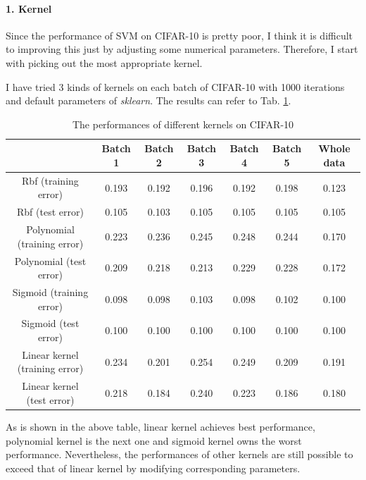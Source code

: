 \documentclass[12pt,a4paper]{article}
\theoremstyle{definition}
\begin{document}
\paragraph{1. Kernel}

\vspace{0.01\linewidth}
Since the performance of SVM on CIFAR-10 is pretty poor, I think it is difficult to improving this just by adjusting some numerical parameters. Therefore, I start with picking out the most appropriate kernel.

\vspace{0.01\linewidth}
I have tried 3 kinds of kernels on each batch of CIFAR-10 with 1000 iterations and default parameters of \textit{sklearn}. The results can refer to Tab. \ref{tab:bonus-kernel}.

\begin{table}[H]
	\renewcommand\arraystretch{1.5}
	\caption{The performances of different kernels on CIFAR-10}
	\label{tab:bonus-kernel}
	\centering
	
	\begin{tabular}{c|c|c|c|c|c|c}
		\centering
		 & Batch 1 & Batch 2 & Batch 3 & Batch 4 & Batch 5 & Whole data \\
		\hline
		\hline
		
		Rbf (training error) & 0.193 & 0.192 & 0.196 & 0.192 & 0.198 &  0.123 \\
		Rbf (test error) & 0.105 & 0.103 & 0.105 & 0.105 & 0.105 & 0.105 \\
		Polynomial (training error) & 0.223 & 0.236 & 0.245 & 0.248 & 0.244 & 0.170 \\
		Polynomial (test error) & 0.209 & 0.218 & 0.213 & 0.229 & 0.228 & 0.172 \\
		Sigmoid (training error) & 0.098 & 0.098 & 0.103 & 0.098 & 0.102 & 0.100 \\
		Sigmoid (test error) & 0.100 & 0.100 & 0.100 & 0.100 & 0.100 & 0.100 \\
		Linear kernel (training error) & 0.234 & 0.201 & 0.254 & 0.249 & 0.209 & 0.191 \\
		Linear kernel (test error) & 0.218 & 0.184 & 0.240 & 0.223 & 0.186 & 0.180 \\
	\end{tabular}
\end{table}

As is shown in the above table, linear kernel achieves best performance, polynomial kernel is the next one and sigmoid kernel owns the worst performance. Nevertheless, the performances of other kernels are still possible to exceed that of linear kernel by modifying corresponding parameters.
\end{document}
